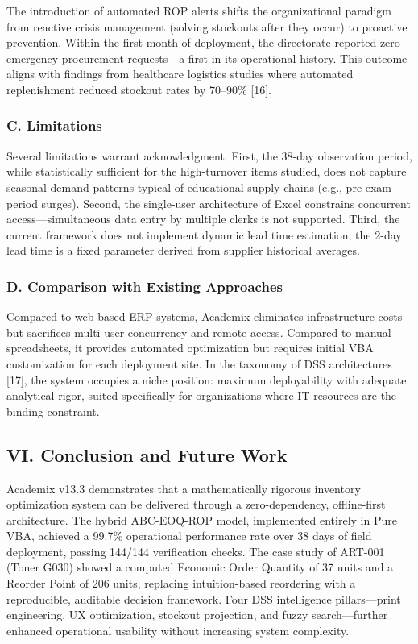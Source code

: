 ﻿\documentclass[conference]{IEEEtran}
\begin{document}
The introduction of automated ROP alerts shifts the organizational
paradigm from reactive crisis management (solving stockouts after they
occur) to proactive prevention. Within the first month of deployment,
the directorate reported zero emergency procurement requests---a first
in its operational history. This outcome aligns with findings from
healthcare logistics studies where automated replenishment reduced
stockout rates by 70--90\% {[}16{]}.

\subsubsection{C. Limitations}\label{c.-limitations}

Several limitations warrant acknowledgment. First, the 38-day
observation period, while statistically sufficient for the high-turnover
items studied, does not capture seasonal demand patterns typical of
educational supply chains (e.g., pre-exam period surges). Second, the
single-user architecture of Excel constrains concurrent
access---simultaneous data entry by multiple clerks is not supported.
Third, the current framework does not implement dynamic lead time
estimation; the 2-day lead time is a fixed parameter derived from
supplier historical averages.

\subsubsection{D. Comparison with Existing
Approaches}\label{d.-comparison-with-existing-approaches}

Compared to web-based ERP systems, Academix eliminates infrastructure
costs but sacrifices multi-user concurrency and remote access. Compared
to manual spreadsheets, it provides automated optimization but requires
initial VBA customization for each deployment site. In the taxonomy of
DSS architectures {[}17{]}, the system occupies a niche position:
maximum deployability with adequate analytical rigor, suited
specifically for organizations where IT resources are the binding
constraint.

\subsection{VI. Conclusion and Future
Work}\label{vi.-conclusion-and-future-work}

Academix v13.3 demonstrates that a mathematically rigorous inventory
optimization system can be delivered through a zero-dependency,
offline-first architecture. The hybrid ABC-EOQ-ROP model, implemented
entirely in Pure VBA, achieved a 99.7\% operational performance rate
over 38 days of field deployment, passing 144/144 verification checks.
The case study of ART-001 (Toner G030) showed a computed Economic Order
Quantity of 37 units and a Reorder Point of 206 units, replacing
intuition-based reordering with a reproducible, auditable decision
framework. Four DSS intelligence pillars---print engineering, UX
optimization, stockout projection, and fuzzy search---further enhanced
operational usability without increasing system complexity.
\end{document}
